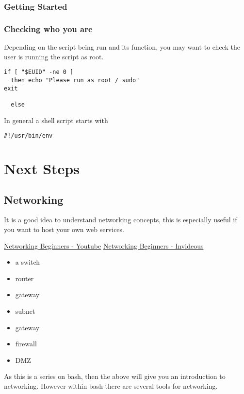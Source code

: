 \documentclass{extbook}
\begin{document}
\subsection{Getting Started}


\subsection{Checking who you are}

Depending on the script being run and its function, you may want to check the user is running the script as root.  

\begin{verbatim}
if [ "$EUID" -ne 0 ]
  then echo "Please run as root / sudo"
exit

  else
\end{verbatim}

In general a shell script starts with 

\begin{verbatim}
#!/usr/bin/env
\end{verbatim}

\chapter{Next Steps}

\section{Networking}

It is a good idea to understand networking concepts, this is especially useful if you want to host your own web services. 

\href{https://www.youtube.com/watch?v=\_IOZ8\_cPgu8}{Networking Beginners - Youtube}
\href{https://invidious.snopyta.org/watch?v=\_IOZ8\_cPgu8}{Networking Beginners - Invideous}

\begin{itemize}
\item a switch
\item router
\item gateway
\item subnet
\item gateway
\item firewall
\item DMZ
\end{itemize}

As this is a series on bash,  then the above will give you an introduction to networking.  However within bash there are several tools for networking.
\end{document}
